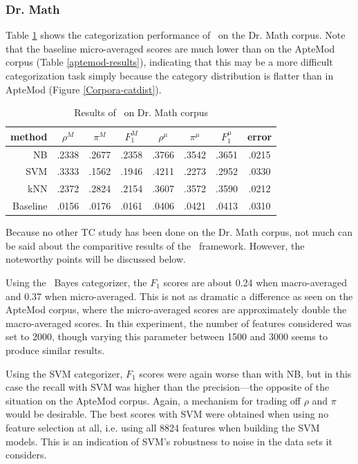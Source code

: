 \subsubsection{Dr. Math}

Table \ref{drmath-results} shows the categorization performance of
\aicat\ on the Dr. Math corpus.  Note that the baseline micro-averaged
scores are much lower than on the ApteMod corpus (Table
\ref{aptemod-results}), indicating that this may be a more difficult
categorization task simply because the category distribution is
flatter than in ApteMod (Figure \ref{Corpora-catdist}).


\begin{table}
\begin{center}
\begin{tabular}{|r c c c c c c c|}
\hline
method    & $\rho^M$ & $\pi^M$ & $F_1^M$ & $\rho^\mu$ & $\pi^\mu$ & $F_1^\mu$ &   error \\
\hline
NB        &   .2338  &  .2677  &  .2358  &  .3766     &  .3542    &  .3651    &  .0215  \\
SVM       &   .3333  &  .1562  &  .1946  &  .4211     &  .2273    &  .2952    &  .0330  \\
kNN       &   .2372  &  .2824  &  .2154  &  .3607     &  .3572    &  .3590    &  .0212  \\
Baseline  &   .0156  &  .0176  &  .0161  &  .0406     &  .0421    &  .0413    &  .0310  \\
\hline
\end{tabular}
\end{center}
\caption{Results of \aicat\ on Dr. Math corpus}
\label{drmath-results}
\end{table}

Because no other TC study has been done on the Dr. Math corpus, not
much can be said about the comparitive results of the \aicat\
framework.  However, the noteworthy points will be discussed below.

Using the \naive\ Bayes categorizer, the $F_1$ scores are about 0.24
when macro-averaged and 0.37 when micro-averaged.  This is not as
dramatic a difference as seen on the ApteMod corpus, where the
micro-averaged scores are approximately double the macro-averaged
scores.  In this experiment, the number of features considered was set
to 2000, though varying this parameter between 1500 and 3000 seems to
produce similar results.

Using the SVM categorizer, $F_1$ scores were again worse than with NB,
but in this case the recall with SVM was higher than the
precision---the opposite of the situation on the ApteMod corpus.
Again, a mechanism for trading off $\rho$ and $\pi$ would be
desirable.  The best scores with SVM were obtained when using no
feature selection at all, i.e. using all 8824 features when building
the SVM models.  This is an indication of SVM's robustness to noise in
the data sets it considers.

